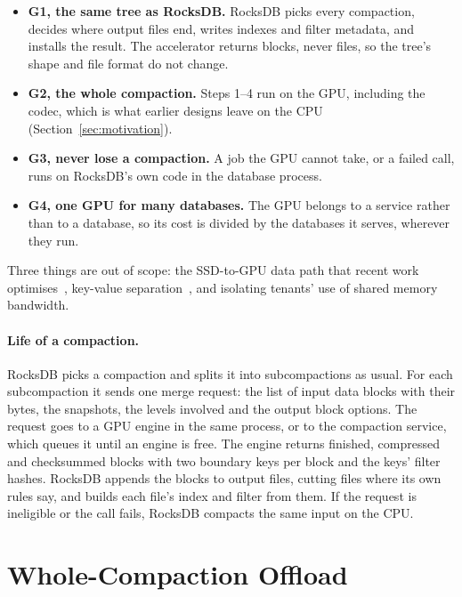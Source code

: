 \documentclass[sigconf, nonacm]{acmart}
\begin{document}
\begin{itemize}
  \item \textbf{G1, the same tree as RocksDB.} RocksDB picks every compaction, decides where
        output files end, writes indexes and filter metadata, and installs the result. The
        accelerator returns blocks, never files, so the tree's shape and file format do not
        change.
  \item \textbf{G2, the whole compaction.} Steps 1--4 run on the GPU, including the codec,
        which is what earlier designs leave on the CPU (Section~\ref{sec:motivation}).
  \item \textbf{G3, never lose a compaction.} A job the GPU cannot take, or a failed call,
        runs on RocksDB's own code in the database process.
  \item \textbf{G4, one GPU for many databases.} The GPU belongs to a service rather than to
        a database, so its cost is divided by the databases it serves, wherever they run.
\end{itemize}

\noindent Three things are out of scope: the SSD-to-GPU data path that recent
work optimises~\cite{zhou2024msst,gpcomp2025,gclcomp2025}, key-value
separation~\cite{gparakv2025}, and isolating tenants' use of shared memory bandwidth.

\paragraph{Life of a compaction.} RocksDB picks a compaction and splits it into
subcompactions as usual. For each subcompaction it sends one merge request: the list of input
data blocks with their bytes, the snapshots, the levels involved and the output block
options. The request goes to a GPU engine in the same process, or to the compaction service,
which queues it until an engine is free. The engine returns finished, compressed and
checksummed blocks with two boundary keys per block and the keys' filter hashes. RocksDB
appends the blocks to output files, cutting files where its own rules say, and builds each
file's index and filter from them. If the request is ineligible or the call fails, RocksDB
compacts the same input on the CPU.

\section{Whole-Compaction Offload}
\label{sec:offload}
\end{document}
